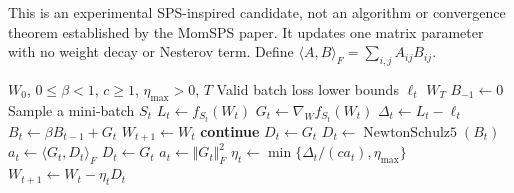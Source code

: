 \documentclass{article}
\begin{document}
\noindent
This is an experimental SPS-inspired candidate, not an algorithm
or convergence theorem established by the MomSPS paper.
It updates one matrix parameter with no weight decay or Nesterov term.
Define $\langle A,B\rangle_F=\sum_{i,j}A_{ij}B_{ij}$.

\begin{algorithm}[ht]
\caption{SPS-inspired Muon candidate with a direction safeguard}
\begin{algorithmic}[1]
\Require $W_0$, $0\le\beta<1$, $c\ge1$, $\eta_{\max}>0$, $T$
\Require Valid batch loss lower bounds $\ell_t$
\Ensure $W_T$
\State $B_{-1}\gets 0$
  \State Sample a mini-batch $S_t$
  \State $L_t\gets f_{S_t}(W_t)$
  \State $G_t\gets\nabla_W f_{S_t}(W_t)$
  \State $\Delta_t\gets L_t-\ell_t$
  \State $B_t\gets\beta B_{t-1}+G_t$
    \State $W_{t+1}\gets W_t$
    \State \textbf{continue}
  \EndIf
    \State $D_t\gets G_t$
  \Else
    \State $D_t\gets\operatorname{NewtonSchulz5}(B_t)$
  \EndIf
  \State $a_t\gets\langle G_t,D_t\rangle_F$
    \State $D_t\gets G_t$ 
    \State $a_t\gets\Vert G_t\Vert_F^2$
  \EndIf
  \State $\eta_t\gets\min\{\Delta_t/(c a_t),\eta_{\max}\}$
  \State $W_{t+1}\gets W_t-\eta_tD_t$
\EndFor
\end{algorithmic}
\end{algorithm}
\end{document}
